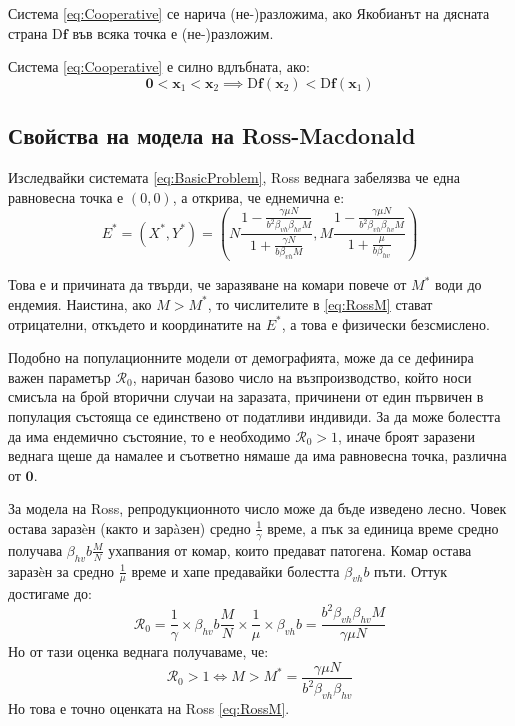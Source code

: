 \begin{definition}
  Система \eqref{eq:Cooperative} се нарича (не-)разложима, ако Якобианът на дясната страна $\mathrm{D}\mathbf{f}$ във всяка точка е (не-)разложим.
\end{definition}

\begin{definition}
  Система \eqref{eq:Cooperative} е силно вдлъбната, ако:
  \begin{equation*}
    \mathbf{0} < \mathbf{x}_1 < \mathbf{x}_2 \implies \mathrm{D}\mathbf{f}(\mathbf{x}_2) < \mathrm{D}\mathbf{f}(\mathbf{x}_1)
  \end{equation*}
\end{definition}

\subsection{Свойства на модела на Ross-Macdonald}
Изследвайки системата \eqref{eq:BasicProblem}, Ross веднага забелязва че една равновесна точка е $(0,0)$, а открива, че еднемична е:
\begin{equation}
  E^* = (X^*, Y^*) = \left(N \frac{1 - \frac{\gamma \mu N}{b^2 \beta_{vh} \beta_{hv} M}}{1 + \frac{\gamma N}{b \beta_{vh} M}}, M \frac{1 - \frac{\gamma \mu N}{b^2 \beta_{vh} \beta_{hv} M}}{1 + \frac{\mu}{b \beta_{hv}}}\right)
\end{equation}

Това е и причината да твърди, че заразяване на комари повече от $M^*$ води до ендемия. Наистина, ако $M > M^*$, то числителите в \eqref{eq:RossM} стават отрицателни, откъдето и координатите на $E^*$, а това е физически безсмислено.

Подобно на популационните модели от демографията, може да се дефинира важен параметър $\mathscr{R}_0$, наричан базово число на възпроизводство, който носи смисъла на брой вторични случаи на заразата, причинени от един първичен в популация състояща се единствено от податливи индивиди.
За да може болестта да има ендемично състояние, то е необходимо $\mathscr{R}_0 > 1$, иначе броят заразени веднага щеше да намалее и съответно нямаше да има равновесна точка, различна от $\mathbf{0}$.

За модела на Ross, репродукционното число може да бъде изведено лесно.
Човек остава заразèн (както и зарàзен) средно $\frac{1}{\gamma}$ време, а пък за единица време средно получава $\beta_{hv} b \frac{M}{N}$ ухапвания от комар, които предават патогена.
Комар остава заразèн за средно $\frac{1}{\mu}$ време и хапе предавайки болестта $\beta_{vh} b$ пъти.
Оттук достигаме до:
\begin{equation}
  \mathscr{R}_0 = \frac{1}{\gamma} \times \beta_{hv} b \frac{M}{N} \times \frac{1}{\mu} \times \beta_{vh} b = \frac{b^2 \beta_{vh} \beta_{hv} M}{\gamma \mu N}
\end{equation}
Но от тази оценка веднага получаваме, че:
\begin{equation}
  \mathscr{R}_0 > 1 \iff M > M^* = \frac{\gamma \mu N}{b^2 \beta_{vh} \beta_{hv}}
\end{equation}
Но това е точно оценката на Ross \eqref{eq:RossM}.

